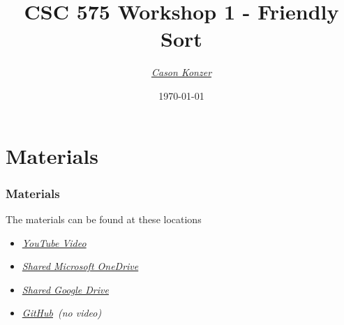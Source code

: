 \documentclass{beamer}
\title[Workshop 1]{CSC 575 Workshop 1 - Friendly Sort}
\author{\XV\textit{\large{\href{https://github.com/casonk}{Cason Konzer}}}\XB}
\institute[UM FLINT]{\normalsize{\textit{\href{mailto:casonk@umich.edu}{casonk@umich.edu}}}}
\date[]{\today}
\newcommand{\XB}{\color{black}}
\newcommand{\XV}{\color{violet}}
\begin{document}
\begin{frame}
    \titlepage
\end{frame}




\section{Materials}

\begin{frame}

    \frametitle{Materials}

    The materials can be found at these locations

    \vspace{2.5mm}
    \begin{itemize}
        \item \XV\textit{\large{\href{https://youtu.be/7ld8Lw43ilU}{YouTube Video}}}\XB
        \item \XV\textit{\large{\href{https://umich-my.sharepoint.com/:f:/g/personal/casonk_umich_edu/EtqLFGQpc6REmjXmrwATvgsBm2_5YP5BmIwHlNsdCIsSkw?e=JpAZZd}{Shared Microsoft OneDrive}}}\XB
        \item \XV\textit{\large{\href{https://drive.google.com/drive/folders/1jGFwkrPJtFuzBKKYkiXPAQZEeKZ2S8tR?usp=share_link}{Shared Google Drive}}}\XB
        \item \XV\textit{\large{\href{https://github.com/casonk/CSC575-Algorithm_and_Complexity_Analysis/tree/main/WorkShop/WorkShop1}{GitHub}}}\XB \ \emph{(no video)}
    \end{itemize}

\end{frame}
\end{document}
